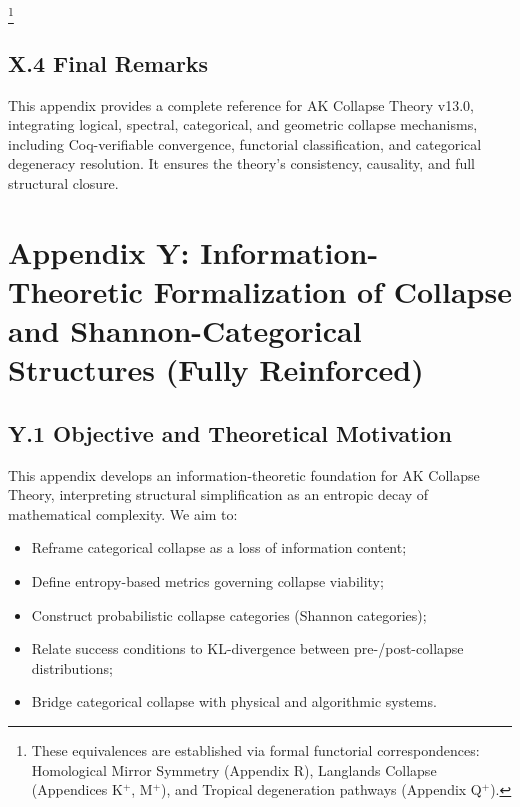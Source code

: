 \documentclass[11pt]{article}
\begin{document}
\footnote{These equivalences are established via formal functorial correspondences:  
Homological Mirror Symmetry (Appendix R),  
Langlands Collapse (Appendices K$^{+}$, M$^{+}$),  
and Tropical degeneration pathways (Appendix Q$^{+}$).}


\subsection*{X.4 Final Remarks}

This appendix provides a complete reference for AK Collapse Theory v13.0, integrating logical, spectral, categorical, and geometric collapse mechanisms, including Coq-verifiable convergence, functorial classification, and categorical degeneracy resolution. It ensures the theory’s consistency, causality, and full structural closure.



\section*{Appendix Y: Information-Theoretic Formalization of Collapse and Shannon-Categorical Structures (Fully Reinforced)}

\subsection*{Y.1 Objective and Theoretical Motivation}

This appendix develops an information-theoretic foundation for AK Collapse Theory, interpreting structural simplification as an entropic decay of mathematical complexity. We aim to:

\begin{itemize}
    \item Reframe categorical collapse as a loss of information content;
    \item Define entropy-based metrics governing collapse viability;
    \item Construct probabilistic collapse categories (Shannon categories);
    \item Relate success conditions to KL-divergence between pre-/post-collapse distributions;
    \item Bridge categorical collapse with physical and algorithmic systems.
\end{itemize}
\end{document}
